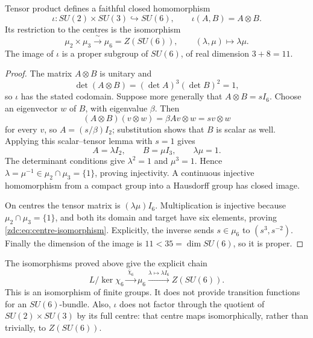 \begin{theorem}
\label{zdc:thm:tensor-centres}
Tensor product defines a faithful closed homomorphism
\begin{equation}
 \iota:SU(2)\times SU(3)\hookrightarrow SU(6),
 \qquad \iota(A,B)=A\otimes B.
 \label{zdc:eq:tensor-map}
\end{equation}
Its restriction to the centres is the isomorphism
\begin{equation}
 \mu_2\times\mu_3\xrightarrow{\ \sim\ }\mu_6=Z(SU(6)),
 \qquad (\lambda,\mu)\longmapsto\lambda\mu.
 \label{zdc:eq:centre-isomorphism}
\end{equation}
The image of \(\iota\) is a proper subgroup of $SU(6)$, of real
dimension $3+8=11$.
\end{theorem}

\begin{proof}
The matrix $A\otimes B$ is unitary and
\[
 \det(A\otimes B)=(\det A)^3(\det B)^2=1,
\]
so \(\iota\) has the stated codomain.  Suppose more generally that
$A\otimes B=sI_6$.  Choose an eigenvector $w$ of $B$, with eigenvalue
$\beta$.  Then
\[
 (A\otimes B)(v\otimes w)=\beta Av\otimes w=sv\otimes w
\]
for every $v$, so $A=(s/\beta)I_2$; substitution shows that $B$ is scalar
as well.  Applying this scalar--tensor lemma with $s=1$ gives
\[
 A=\lambda I_2,\qquad B=\mu I_3,\qquad \lambda\mu=1.
\]
The determinant conditions give $\lambda^2=1$ and $\mu^3=1$.  Hence
\(\lambda=\mu^{-1}\in\mu_2\cap\mu_3=\{1\}\), proving injectivity.  A
continuous injective homomorphism from a compact group into a Hausdorff
group has closed image.

On centres the tensor matrix is $(\lambda\mu)I_6$.  Multiplication is
injective because $\mu_2\cap\mu_3=\{1\}$, and both its domain and target
have six elements, proving \eqref{zdc:eq:centre-isomorphism}.  Explicitly,
the inverse sends $s\in\mu_6$ to $(s^3,s^{-2})$.  Finally the dimension of
the image is $11<35=\dim SU(6)$, so it is proper.
\end{proof}

The isomorphisms proved above give the explicit chain
\begin{equation}
 L/\ker\chi_6\xrightarrow{\ \overline\chi_6\ }\mu_6
 \xrightarrow{\lambda\mapsto\lambda I_6}Z(SU(6)).
 \label{zdc:eq:lattice-to-centre}
\end{equation}
This is an isomorphism of finite groups.  It does not provide transition
functions for an $SU(6)$-bundle.  Also, \(\iota\) does not factor through
the quotient of $SU(2)\times SU(3)$ by its full centre: that centre maps
isomorphically, rather than trivially, to $Z(SU(6))$.

